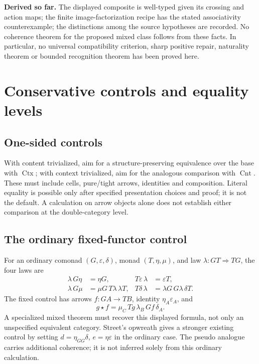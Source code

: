 \documentclass[11pt,a4paper]{article}
\newcommand{\Ctx}{\operatorname{Ctx}}
\newcommand{\Cnt}{\operatorname{Cnt}}
\begin{document}
\textbf{Derived so far.} The displayed composite is well-typed given its
crossing and action maps; the finite image-factorization recipe has the stated
associativity counterexample; the distinctions among the source hypotheses
are recorded. No coherence theorem for the proposed mixed class follows from
these facts. In particular, no universal compatibility criterion, sharp positive
repair, naturality theorem or bounded recognition theorem has been proved here.

\section{Conservative controls and equality levels}

\subsection{One-sided controls}

With content trivialized, aim for a structure-preserving equivalence over the
base with \(\Ctx\); with context trivialized, aim for the analogous comparison
with \(\Cnt\). These must include cells, pure/tight arrows, identities and
composition. Literal equality is possible only after specified presentation
choices and proof; it is not the default. A calculation on arrow objects alone
does not establish either comparison at the double-category level.

\subsection{The ordinary fixed-functor control}

For an ordinary comonad \((G,\varepsilon,\delta)\), monad
\((T,\eta,\mu)\), and law \(\lambda:GT\Rightarrow TG\), the four laws are
\begin{align*}
 \lambda\,G\eta&=\eta G,& T\varepsilon\,\lambda&=\varepsilon T,\\
 \lambda\,G\mu&=\mu G\,T\lambda\,\lambda T,&
 T\delta\,\lambda&=\lambda G\,G\lambda\,\delta T.
\end{align*}
The fixed control has arrows \(f:GA\to TB\), identity
\(\eta_A\varepsilon_A\), and
\[
 g\star f=\mu_C\,Tg\,\lambda_B\,Gf\,\delta_A.
\]
A specialized mixed theorem must recover this displayed formula, not only an
unspecified equivalent category. Street's opwreath gives a stronger existing
control by setting \(d=\eta_{GG}\delta\), \(e=\eta\varepsilon\) in the ordinary
case. The pseudo analogue carries additional coherence; it is not inferred
solely from this ordinary calculation.
\end{document}
